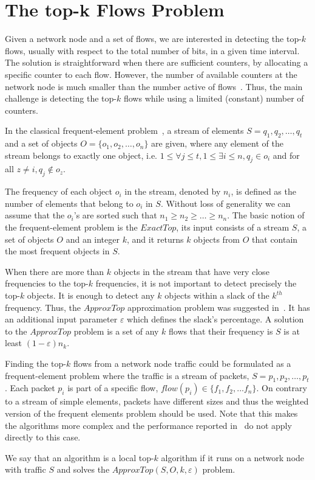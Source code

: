 \section{The top-k Flows Problem}
Given a network node and a set of flows, we are interested in detecting the top-$k$ flows, usually with respect to the total number of bits, in a given time interval. The solution is straightforward when there are sufficient counters, by allocating a specific counter to each flow. However, the number of available counters at the network node is much smaller than the number active of flows~\cite{OFLOPS}. Thus, the main challenge is detecting the top-$k$ flows while using a limited (constant) number of counters.

In the classical frequent-element problem~\cite{Charikar2004}, a stream of elements $S=q_1,q_2,\dots,q_t$ and a set of objects $O=\{o_1,o_2,\dots,o_n\}$ are given, where any element of the stream belongs to exactly one object, i.e. $1\leq \forall j \leq t, 1\leq\exists i\leq n, q_j\in o_i$ and for all $z\neq i, q_j \notin o_z$.

The frequency of each object $o_i$ in the stream, denoted by $n_i$, is defined as the number of elements that belong to $o_i$ in $S$. Without loss of generality we can assume that the $o_i$'s are sorted such that $n_1\geq n_2 \geq \dots \geq n_n$. The basic notion of the frequent-element problem is the $ExactTop$, its input consists of a stream $S$, a set of objects $O$ and an integer $k$, and it returns $k$ objects from $O$ that contain the most frequent objects in $S$.

When there are more than $k$ objects in the stream that have very close frequencies to the top-$k$ frequencies, it is not important to detect precisely the top-$k$ objects. It is enough to detect any $k$ objects within a slack of the $k^{th}$ frequency. Thus, the $ApproxTop$ approximation problem was suggested in~\cite{Charikar2004}. It has an additional input parameter $\varepsilon$ which defines the slack's percentage.
A solution to the $ApproxTop$ problem is a set of any $k$ flows that their frequency is $S$ is at least $(1-\varepsilon)n_k$.

Finding the top-$k$ flows from a network node traffic could be formulated as a frequent-element problem where the traffic is a stream of packets, $S=p_1,p_2,\dots,p_t$. Each packet $p_i$ is part of a specific flow, $flow(p_i)\in\{f_1,f_2,...f_n\}$. On contrary to a stream of simple elements, packets have different sizes and thus the weighted version of the frequent elements problem should be used. Note that this makes the algorithms more complex and the performance reported in~\cite{Ben-Basat2017} do not apply directly to this case.

We say that an algorithm is a local top-$k$ algorithm if it runs on a network node with traffic $S$ and solves the $ApproxTop(S,O,k,\varepsilon)$ problem.
